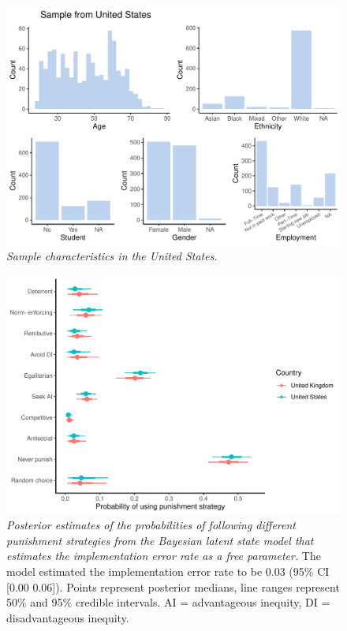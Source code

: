 \documentclass[
  man,floatsintext]{apa6}
\begin{document}
\newpage



\begin{figure}
\centering
\includegraphics{manuscript_files/figure-latex/plotSampleUS-1.pdf}
\caption{\label{fig:plotSampleUS}\emph{Sample characteristics in the United States.}}
\end{figure}

\newpage










\begin{figure}
\centering
\includegraphics{manuscript_files/figure-latex/plotModel5-1.pdf}
\caption{\label{fig:plotModel5}\emph{Posterior estimates of the probabilities of following
different punishment strategies from the Bayesian latent state model that
estimates the implementation error rate as a free parameter.} The model
estimated the implementation error rate to be 0.03
(95\% CI {[}0.00
0.06{]}). Points represent posterior medians, line
ranges represent 50\% and 95\% credible intervals. AI = advantageous inequity, DI
= disadvantageous inequity.}
\end{figure}
\end{document}
